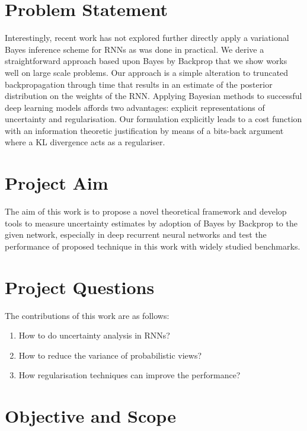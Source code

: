
\section{Problem Statement}

Interestingly, recent work has not explored further directly apply a variational Bayes inference scheme for RNNs as was done in practical.
We derive a straightforward approach based upon Bayes by Backprop \cite{Blundell2015a} that we show works well on large scale problems.
Our approach is a simple alteration to truncated backpropagation through time that results in an estimate of the posterior distribution on the weights of the RNN.
Applying Bayesian methods to successful deep learning models affords two advantages: explicit representations of uncertainty and regularisation.
Our formulation explicitly leads to a cost function with an information theoretic justification by means of a bits-back argument \cite{Hinton1993} where a KL divergence acts as a regulariser.

\section{Project Aim}

The aim of this work is to propose a novel theoretical framework and develop tools to measure uncertainty estimates by adoption of Bayes by Backprop to the given network, especially in deep recurrent neural networks and test the performance of proposed technique in this work with widely studied benchmarks.

\section{Project Questions}

The contributions of this work are as follows:
\begin{enumerate}
	\item How to do uncertainty analysis in RNNs?
	\item How to reduce the variance of probabilistic views?
	\item How regularisation techniques can improve the performance?
\end{enumerate}

\section{Objective and Scope}

